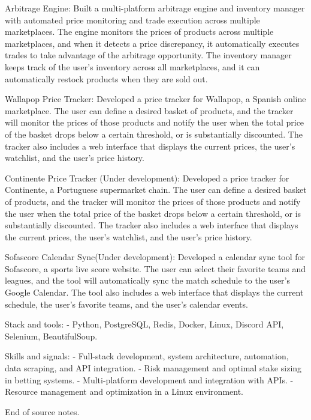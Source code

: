 \begin{cventries}
{        Arbitrage Engine:
          Built a multi-platform arbitrage engine and inventory manager with automated price monitoring and trade execution across multiple marketplaces.
          The engine monitors the prices of products across multiple marketplaces, and when it detects a price discrepancy, it automatically executes trades to take advantage of the arbitrage opportunity.
          The inventory manager keeps track of the user's inventory across all marketplaces, and it can automatically restock products when they are sold out.

        Wallapop Price Tracker:
          Developed a price tracker for Wallapop, a Spanish online marketplace.
          The user can define a desired basket of products, and the tracker will monitor the prices of those products and notify the user when the total price of the basket drops below a certain threshold, or is substantially discounted.
          The tracker also includes a web interface that displays the current prices, the user's watchlist, and the user's price history.

        Continente Price Tracker (Under development):
          Developed a price tracker for Continente, a Portuguese supermarket chain.
          The user can define a desired basket of products, and the tracker will monitor the prices of those products and notify the user when the total price of the basket drops below a certain threshold, or is substantially discounted.
          The tracker also includes a web interface that displays the current prices, the user's watchlist, and the user's price history.

        Sofascore Calendar Sync(Under development):
          Developed a calendar sync tool for Sofascore, a sports live score website.
          The user can select their favorite teams and leagues, and the tool will automatically sync the match schedule to the user's Google Calendar.
          The tool also includes a web interface that displays the current schedule, the user's favorite teams, and the user's calendar events.

    Stack and tools:
    - Python, PostgreSQL, Redis, Docker, Linux, Discord API, Selenium, BeautifulSoup.

    Skills and signals:
    - Full-stack development, system architecture, automation, data scraping, and API integration.
    - Risk management and optimal stake sizing in betting systems.
    - Multi-platform development and integration with APIs.
    - Resource management and optimization in a Linux environment.


    End of source notes.
    } %
\end{cventries}
